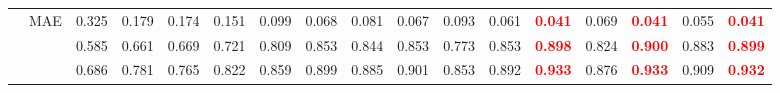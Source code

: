 \documentclass[runningheads]{llncs}
\begin{document}
\begin{table}[t]
{\begin{tabular}{@{}rl|ccccccccccc|cc|cc@{}}
    & MAE                  & 0.325                                     & 0.179                                       & 0.174                                       & 0.151                                  & 0.099                                      & 0.068                                          & 0.081                                      & 0.067                                        & 0.093                                            & 0.061                                      & \textcolor{red}{\textbf{0.041}} & 0.069                                          & \textcolor{red}{\textbf{0.041}} & 0.055                                     & \textcolor{red}{\textbf{0.041}} \\
    &               & 0.585                                     & 0.661                                       & 0.669                                       & 0.721                                  & 0.809                                      & 0.853                                          & 0.844                                      & 0.853                                        & 0.773                                            & 0.853                                      & \textcolor{red}{\textbf{0.898}} & 0.824                                          & \textcolor{red}{\textbf{0.900}} & 0.883                                     & \textcolor{red}{\textbf{0.899}} \\
    &               & 0.686                                     & 0.781                                       & 0.765                                       & 0.822                                  & 0.859                                      & 0.899                                          & 0.885                                      & 0.901                                        & 0.853                                            & 0.892                                      & \textcolor{red}{\textbf{0.933}} & 0.876                                          & \textcolor{red}{\textbf{0.933}} & 0.909                                     & \textcolor{red}{\textbf{0.932}} \\
   \bottomrule
  \end{tabular}}
\end{table}
\end{document}
